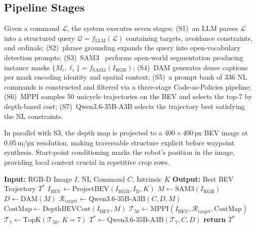 \documentclass{article}
\begin{document}
\subsection{Pipeline Stages}

Given a command $\mathcal{L}$, the system executes seven stages: (S1)~an LLM parses $\mathcal{L}$ into a structured query $\mathcal{Q} = f_{\text{LLM}}(\mathcal{L})$ containing targets, avoidance constraints, and ordinals; (S2)~phrase grounding expands the query into open-vocabulary detection prompts; (S3)~SAM3~\citep{carion2025sam3} performs open-world segmentation producing instance masks $\{M_i, \ell_i\} = f_{\text{SAM3}}(I_{\text{RGB}})$; (S4)~DAM generates dense captions per mask encoding identity and spatial context; (S5)~a prompt bank of 336 NL commands is constructed and filtered via a three-stage Code-as-Policies pipeline; (S6)~MPPI samples 50 unicycle trajectories on the BEV and selects the top-7 by depth-based cost; (S7)~Qwen3.6-35B-A3B selects the trajectory best satisfying the NL constraints.

In parallel with S3, the depth map is projected to a $400{\times}400$\,px BEV image at $0.05$\,m/px resolution, making traversable structure explicit before waypoint synthesis. Start-point conditioning marks the robot's position in the image, providing local context crucial in repetitive crop rows.

\begin{algorithm}[t]
\caption{On-robot execution layer: realizing an NL-generated target region as a single trajectory. The quantitatively evaluated contribution (Sec.~\ref{sec:experiments}) is the NL$\to$area-equation \emph{planning} layer; this routine consumes its output region $\mathcal{R}_{\text{target}}$ for deployment.}
\label{alg:traj_gen}
\begin{algorithmic}[1]
\STATE \textbf{Input:} RGB-D Image $I$, NL Command $C$, Intrinsic $K$
\STATE \textbf{Output:} Best BEV Trajectory $T^*$
\STATE $I_{\text{BEV}} \leftarrow \text{ProjectBEV}(I_{\text{RGB}}, I_{\text{D}}, K)$ 
\STATE $M \leftarrow \text{SAM3}(I_{\text{RGB}})$ 
\STATE $D \leftarrow \text{DAM}(M)$ 
\STATE $\mathcal{R}_{\text{target}} \leftarrow \text{Qwen3.6-35B-A3B}(C, D, M)$ 
\STATE $\text{CostMap} \leftarrow \text{DepthBEVCost}(I_{\text{BEV}}, M)$ 
\STATE $\mathcal{T}_{50} \leftarrow \text{MPPI}(I_{\text{BEV}}, \mathcal{R}_{\text{target}}, \text{CostMap})$ 
\STATE $\mathcal{T}_{7} \leftarrow \text{TopK}(\mathcal{T}_{50},\, K{=}7)$ 
\STATE $T^* \leftarrow \text{Qwen3.6-35B-A3B}(\mathcal{T}_{7}, C, D)$ 
\STATE \textbf{return} $T^*$
\end{algorithmic}
\end{algorithm}
\end{document}
